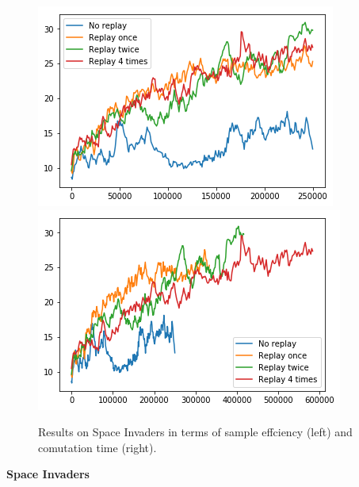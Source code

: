 \begin{figure}[h]
\includegraphics[scale=0.55]{bilder/spaceinvbyonline.png}
\includegraphics[scale=0.55]{bilder/spaceinvbytime.png}
\caption{ Results on Space Invaders in terms of sample effciency (left) and comutation time (right).}
\end{figure}

\pagebreak
\textbf{Space Invaders}


